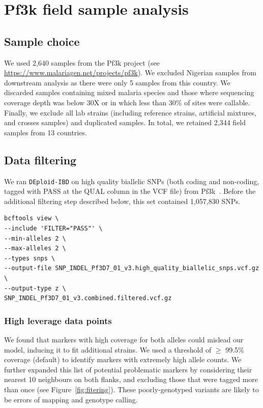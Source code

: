 \documentclass[9pt]{article}
\begin{document}
\newpage

\section{Pf3k field sample analysis}
\subsection{Sample choice}
We used 2,640 samples from the Pf3k project (see \url{https://www.malariagen.net/projects/pf3k}). We excluded Nigerian samples from downstream analysis as there were only 5 samples from this country.  We discarded samples containing mixed malaria species and those where sequencing coverage depth was below 30X or in which less than 30\% of sites were callable. Finally, we exclude all lab strains (including reference strains, artificial mixtures, and crosses samples) and duplicated samples. In total, we retained 2,344 field samples from 13 countries.

\subsection{Data filtering}
We ran {\tt DEploid-IBD} on high quality biallelic SNPs (both coding and non-coding, tagged with PASS at the QUAL column in the VCF file) from Pf3k~\citep{pf3k}. Before the additional filtering step described below, this set contained 1,057,830 SNPs.
\linespread{1}
\begin{lstlisting}
bcftools view \
--include 'FILTER="PASS"' \
--min-alleles 2 \
--max-alleles 2 \
--types snps \
--output-file SNP_INDEL_Pf3D7_01_v3.high_quality_biallelic_snps.vcf.gz \
--output-type z \
SNP_INDEL_Pf3D7_01_v3.combined.filtered.vcf.gz
\end{lstlisting}

\subsubsection{High leverage data points}

We found that markers with high coverage for both alleles could mislead our model, inducing it to fit additional strains. We used a threshold of $\geq$ 99.5\% coverage (default) to identify markers with extremely high allele counts. We further expanded this list of potential problematic markers by considering their nearest 10 neighbours on both flanks, and excluding those that were tagged more than once (see Figure~\ref{fig:fitering}). These poorly-genotyped variants are likely to be errors of mapping and genotype calling.
\end{document}
